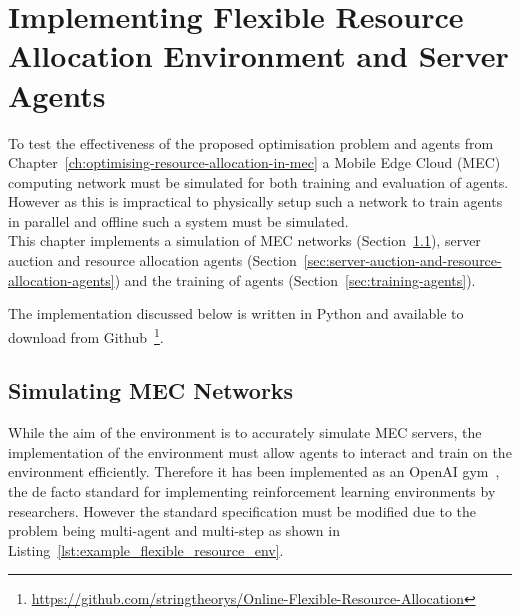 

\chapter{Implementing Flexible Resource Allocation Environment and Server Agents}
\label{ch:implementing-flexible-resource-allocation-environment-and-server-agents}
To test the effectiveness of the proposed optimisation problem and agents from
Chapter~\ref{ch:optimising-resource-allocation-in-mec} a Mobile Edge Cloud
(MEC) computing network must be simulated for both training and evaluation of agents. However as this is impractical to
physically setup such a network to train agents in parallel and offline such a system must be simulated. \\
This chapter implements a simulation of MEC
networks (Section~\ref{sec:simulating-mec-networks}), server auction and resource
allocation agents (Section~\ref{sec:server-auction-and-resource-allocation-agents}) and the training of agents
(Section~\ref{sec:training-agents}).

The implementation discussed below is written in Python and available to download from
Github~\footnote{\url{https://github.com/stringtheorys/Online-Flexible-Resource-Allocation}}.

\section{Simulating MEC Networks}
\label{sec:simulating-mec-networks}
While the aim of the environment is to accurately simulate MEC servers, the implementation of the environment must
allow agents to interact and train on the environment efficiently. Therefore it has been implemented
as an OpenAI gym~\citep{openaigym}, the de facto standard for implementing reinforcement learning environments by
researchers. However the standard specification must be modified due to the problem being multi-agent and multi-step
as shown in Listing~\ref{lst:example_flexible_resource_env}.

